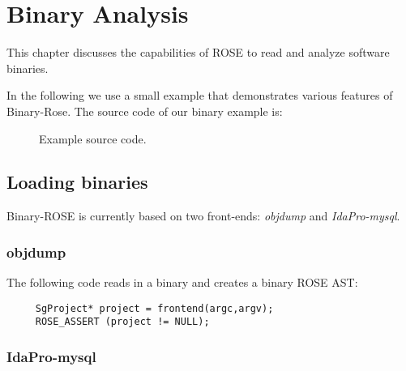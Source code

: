 \chapter{Binary Analysis}

This chapter discusses the capabilities of ROSE to read and analyze software binaries.

In the following we use a small example that demonstrates various features of Binary-Rose.
The source code of our binary example is:

\begin{figure}[!h]
{\indent
{\mySmallFontSize


\begin{latexonly}
   
\end{latexonly}

\begin{htmlonly}
   
\end{htmlonly}

}
}
\caption{Example source code.}
\label{Tutorial:examplesourcecode}
\end{figure}


\section{Loading binaries}

Binary-ROSE is currently based on two front-ends: \emph{objdump} and \emph{IdaPro-mysql}.

\subsection{objdump}

The following code reads in a binary and creates a binary ROSE AST:

{\mySmallFontSize
\begin{verbatim}
     SgProject* project = frontend(argc,argv);
     ROSE_ASSERT (project != NULL);
\end{verbatim}
}


\subsection{IdaPro-mysql}

